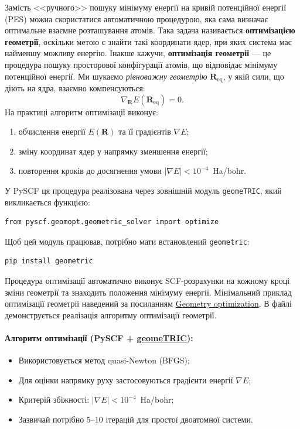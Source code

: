 Замість <<ручного>> пошуку мінімуму енергії на кривій потенційної енергії (PES)
можна скористатися автоматичною процедурою, яка сама визначає оптимальне
взаємне розташування атомів.
Така задача називається \textbf{оптимізацією геометрії}, оскільки метою є знайти
такі координати ядер, при яких система має найменшу можливу енергію.
Інакше кажучи, \textbf{оптимізація геометрії} --- це процедура пошуку просторової
конфігурації атомів, що відповідає мінімуму потенційної енергії.
Ми шукаємо \emph{рівноважну геометрію} $\mathbf{R}_\text{eq}$, у якій сили,
що діють на ядра, взаємно компенсуються:
\[
	\nabla_{\mathbf{R}} E(\mathbf{R}_\text{eq}) = 0.
\]
На практиці алгоритм оптимізації виконує:
\begin{enumerate}
	\item обчислення енергії $E(\mathbf{R})$ та її градієнтів $\nabla E$;
	\item зміну координат ядер у напрямку зменшення енергії;
	\item повторення кроків до досягнення умови $|\nabla E| < 10^{-4}$~Ha/bohr.
\end{enumerate}
У PySCF ця процедура реалізована через зовнішній модуль \texttt{geomeTRIC},
який викликається функцією:
\begin{verbatim}
from pyscf.geomopt.geometric_solver import optimize
\end{verbatim}
Щоб цей модуль працював, потрібно мати встановлений \texttt{geometric}:
\begin{verbatim}
pip install geometric
\end{verbatim}
Процедура оптимізації автоматично виконує SCF-розрахунки на кожному кроці зміни геометрії
та знаходить положення мінімуму енергії.
Мінімальний приклад оптимізації геометрії наведений за посиланням \href{https://pyscf.org/user/geomopt.html}{Geometry optimization}.
В файлі  демонструється реалізація алгоритму оптимізації геометрії.

\paragraph{Алгоритм оптимізації (PySCF + \href{https://geometric.readthedocs.io}{geomeTRIC}):}
\begin{itemize}
	\item Використовується метод quasi-Newton (BFGS);
	\item Для оцінки напрямку руху застосовуються градієнти енергії $\nabla E$;
	\item Критерій збіжності: $|\nabla E| < 10^{-4}$~Ha/bohr;
	\item Зазвичай потрібно 5--10 ітерацій для простої двоатомної системи.
\end{itemize}


